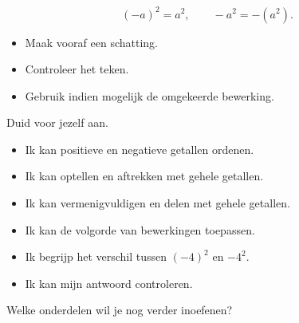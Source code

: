 \documentclass{ximera}
\begin{document}

\[
(-a)^2=a^2,
\qquad
-a^2=-(a^2).
\]


\begin{itemize}
    \item Maak vooraf een schatting.
    \item Controleer het teken.
    \item Gebruik indien mogelijk de omgekeerde bewerking.
\end{itemize}


Duid voor jezelf aan.

\begin{itemize}
    \item[$\square$] Ik kan positieve en negatieve getallen ordenen.
    \item[$\square$] Ik kan optellen en aftrekken met gehele getallen.
    \item[$\square$] Ik kan vermenigvuldigen en delen met gehele getallen.
    \item[$\square$] Ik kan de volgorde van bewerkingen toepassen.
    \item[$\square$] Ik begrijp het verschil tussen $(-4)^2$ en $-4^2$.
    \item[$\square$] Ik kan mijn antwoord controleren.
\end{itemize}

\begin{problem}
Welke onderdelen wil je nog verder inoefenen?

\begin{selectAll}
\end{selectAll}
\end{problem}
\end{document}
